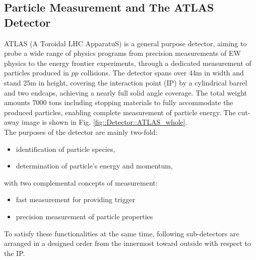 

\subsection{Particle Measurement and The ATLAS Detector}
ATLAS (A Toroidal LHC ApparatuS) is a general purpose detector, aiming to probe a wide range of physics programs from precision measurements of EW physics to the energy frontier experiments, through a dedicated measurement of particles produced in $pp$ collisions. The detector spans over 44m in width and stand 25m in height, covering the interaction point (IP) by a cylindrical barrel and two endcaps, achieving a nearly full solid angle coverage. The total weight amounts 7000 tons including stopping materials to fully accommodate the produced particles, enabling complete measurement of particle energy. The cut-away image is shown in Fig. \ref{fig::Detector::ATLAS_whole}. \\

The purposes of the detector are mainly two-fold:
\begin{itemize}
\item identification of particle species,
\item determination of particle's energy and momentum,
\end{itemize}
with two complemental concepts of measurement:
\begin{itemize}
\item fast measurement for providing trigger
\item precision measurement of particle properties
\end{itemize}
 
To satisfy these functionalities at the same time, following sub-detectors are arranged in a designed order from the innermost toward outside with respect to the IP.

